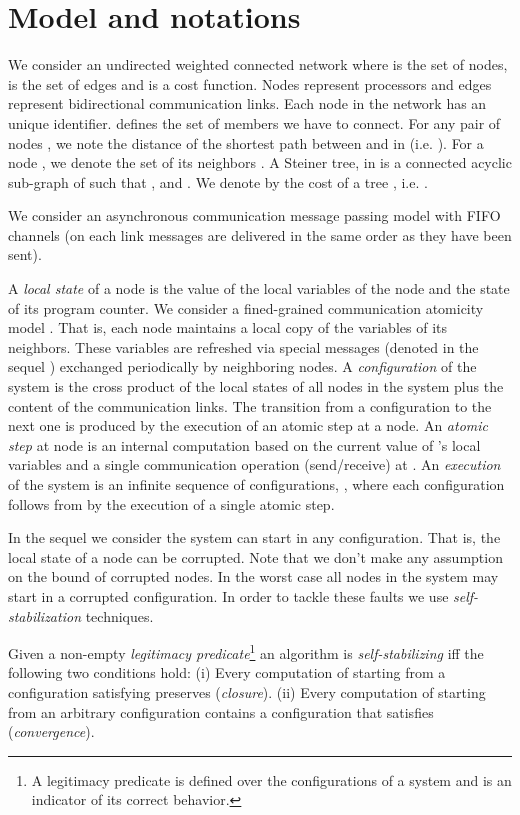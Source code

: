 \documentclass[11pt]{article}
\begin{document}
\section{Model and notations} 
\label{sec:model}
We consider an undirected weighted connected network  where
 is the set of nodes,  is the set of edges and  is a cost function. Nodes represent processors and edges
represent bidirectional communication links. Each node in the network
has an unique identifier. 
 defines the set of members we have to connect. For any pair of nodes , we note  the distance of the shortest path  between  and  in  (i.e. ). For a node , we denote the set of its neighbors . A Steiner tree,  in  is a connected acyclic sub-graph of  such that ,  and . We denote by  the cost of a tree , i.e. .



We consider an asynchronous communication message passing model with
FIFO channels (on each link messages are delivered in the same order as
they have been sent).

A {\it local state} of a node is the value of the local variables of
the node and the state of its program counter. 
We consider a fined-grained communication atomicity model \cite{BK07,Dol00}. That is,
each node maintains a local copy of the variables of its
neighbors. These variables are refreshed via special
messages (denoted in the sequel ) exchanged periodically 
by neighboring nodes.
A {\it configuration} of the
system is the cross product of the local states of all nodes in the
system plus the content of the communication links. 
The transition from a configuration to the next one is produced by the
execution of an atomic step at a node. An {\it atomic step} at node  
is an internal computation based on the
current value of 's local variables and a single communication
operation (send/receive) at . 
An {\it execution} of the system is an infinite sequence of
configurations, , where each
configuration  follows from  by the execution 
of a single atomic step.

In the sequel we consider the system can start in any
configuration. That is, the local state of a node can be corrupted.
Note that we don't make any assumption on the bound of
corrupted nodes. In the worst case all nodes in the system 
may start in a corrupted configuration.
In order to tackle these faults we use {\it self-stabilization} techniques.

Given  a non-empty
\emph{legitimacy predicate}\footnote{A legitimacy predicate is 
defined over the configurations of a system and 
is an indicator of its correct behavior.} 
an algorithm  is \emph{self-stabilizing} 
iff
the following two conditions hold:
\textsf{(i)} Every computation of  starting from a configuration
satisfying  preserves  (\emph{closure}).  
\textsf{(ii)} Every computation of  starting from an arbitrary configuration
contains a configuration that satisfies 
(\emph{convergence}).
\end{document}
